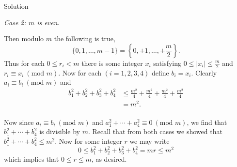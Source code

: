 \documentclass{article}
\begin{document}
\begin{solution}{Solution}
{\color{gray} \hline}
\vspace{0.2cm}

\textit{Case 2: $m$ is even.} \vspace{0.2cm}

Then modulo $m$ the following is true,
$$
\{ 0,1,\ldots, m-1 \} = \left\{ 0, \pm 1, \ldots, \pm \frac{m}{2} \right\}.
$$
Thus for each $0 \leq r_i < m$ there is some integer $x_i$ satisfying
$0 \leq |x_i| \leq \frac{m}{2}$ and $r_i \equiv x_i \ (\text{mod } m)$.
Now for each $(i=1,2,3,4)$ define $b_i = x_i$. Clearly
$a_i \equiv b_i \ (\text{mod } m)$ and
\[
\begin{aligned}
b_1^2 + b_2^2 + b_3^2 + b_4^2 &\leq \frac{m^2}{4} +
\frac{m^2}{4} + \frac{m^2}{4} + \frac{m^2}{4} \\
&= m^2. \\
\end{aligned}
\]

{\color{gray} \hline}
\vspace{0.2cm}

Now since $a_i \equiv b_i \ (\text{mod } m)$ and
$a_1^2 + \cdots + a_4^2 \equiv 0 \ (\text{mod } m)$, we find that
$b_1^2 + \cdots + b_4^2$ is divisible by $m$.
Recall that from both cases we showed that
$b_1^2 + \cdots + b_4^2 \leq m^2$. Now for some integer $r$ we may write
$$
0 \leq b_1^2 + b_2^2 + b_3^2 + b_4^2 = mr \leq m^2
$$
which implies that $0 \leq r \leq m$, as desired. \\


\end{solution}
\end{document}
